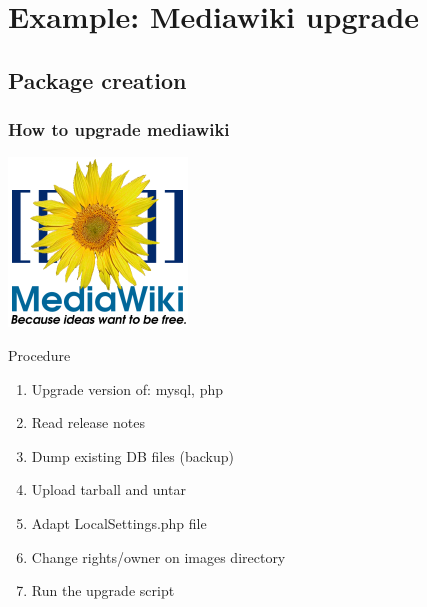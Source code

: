 \documentclass[11pt,compress,final]{beamer}
\begin{document}
\section{Example: Mediawiki upgrade}
\subsection{Package creation}
\begin{frame}
\frametitle{How to upgrade mediawiki}
\begin{center}
\includegraphics[scale=0.2]{figures/mw}
\end{center}
\begin{block}{Procedure}
\begin{enumerate}
\item Upgrade version of: mysql, php
\item Read release notes
\item Dump existing DB files (backup)
\item Upload tarball and untar
\item Adapt LocalSettings.php file
\item Change rights/owner on images directory
\item Run the upgrade script
\end{enumerate}
\end{block}
\end{frame}
\end{document}
